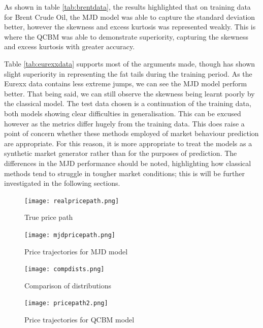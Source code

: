 \documentclass[12pt]{article}
\newcommand{\newp}
    {
    \vskip 0.5cm 
  }
\numberwithin{equation}{section}
\begin{document}
As shown in table \ref{tab:brentdata}, the results highlighted that on training data 
for Brent Crude Oil, the 
MJD model was able to capture the standard deviation better, however the skewness 
and excess kurtosis was represented weakly. This is where the QCBM was able to 
demonstrate superiority, 
capturing the skewness and excess kurtosis with greater accuracy.
\newp 
Table \ref{tab:eurexxdata} supports most of the arguments made, though has shown 
slight superiority in representing the fat tails during the training period. 
As the Eurexx data contains less extreme jumps, we can see the MJD model perform 
better. That being said, we can still observe the skewness being learnt poorly
by the classical model. The test data chosen is a continuation of the training data,
both models showing clear difficulties in generalisation. This can be excused however 
as the metrics differ hugely from the training data. This does raise a point of 
concern whether these methods employed of market behaviour prediction are 
appropriate. For this reason, it is more appropriate to treat the models as a 
synthetic market generator rather than for the purposes of prediction. The differences 
in the MJD performance should be noted, highlighting how classical methods 
tend to struggle in tougher market conditions; this is will be further investigated 
in the following sections.
\begin{figure}[h!]
    \centering
    \begin{minipage}{0.48\textwidth}
        \centering
        \texttt{[image: realpricepath.png]}
        \caption{True price path}
        \label{fig:realpricepath}
    \end{minipage}
    \hfill
    \begin{minipage}{0.48\textwidth}
        \centering
        \texttt{[image: mjdpricepath.png]}
        \caption{Price trajectories for MJD model}
        \label{fig:mjdpricepath}
    \end{minipage}
\end{figure}

\begin{figure}[h!]
    \centering
    \begin{minipage}{0.48\textwidth}
        \centering
        \texttt{[image: compdists.png]}
        \caption{Comparison of distributions}
        \label{fig:compdists}
    \end{minipage}
    \hfill
    \begin{minipage}{0.48\textwidth}
        \centering
        \texttt{[image: pricepath2.png]}
        \caption{Price trajectories for QCBM model}
        \label{fig:pricepath}
    \end{minipage}
\end{figure}
\end{document}
